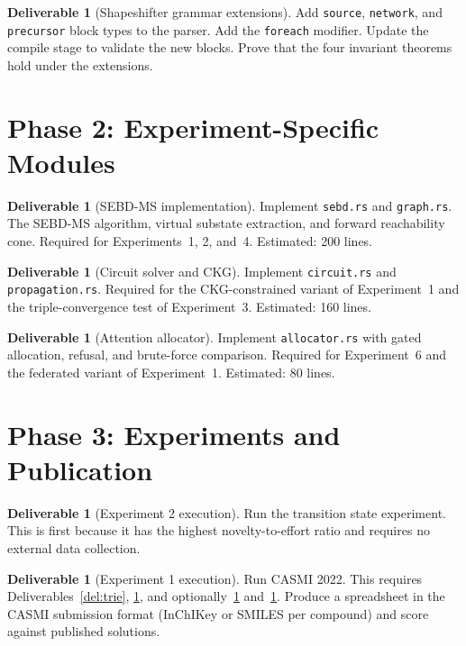 \documentclass[11pt,a4paper]{article}
\theoremstyle{planstyle}
\theoremstyle{definition}
\newtheorem{deliverable}[theorem]{Deliverable}
\theoremstyle{remark}
\newcommand{\shk}[1]{\texttt{#1}}
\begin{document}
\begin{deliverable}[Shapeshifter grammar extensions]
\label{del:grammar}
Add \shk{source}, \shk{network}, and \shk{precursor} block types to
the parser. Add the \shk{foreach} modifier. Update the compile stage
to validate the new blocks. Prove that the four invariant theorems
hold under the extensions.
\end{deliverable}

\section{Phase 2: Experiment-Specific Modules}
\label{sec:phase2}

\begin{deliverable}[SEBD-MS implementation]
\label{del:sebd}
Implement \shk{sebd.rs} and \shk{graph.rs}. The SEBD-MS algorithm,
virtual substate extraction, and forward reachability cone. Required
for Experiments~1, 2, and~4. Estimated: 200 lines.
\end{deliverable}

\begin{deliverable}[Circuit solver and CKG]
\label{del:circuit}
Implement \shk{circuit.rs} and \shk{propagation.rs}. Required for the
CKG-constrained variant of Experiment~1 and the triple-convergence test
of Experiment~3. Estimated: 160 lines.
\end{deliverable}

\begin{deliverable}[Attention allocator]
\label{del:allocator}
Implement \shk{allocator.rs} with gated allocation, refusal, and
brute-force comparison. Required for Experiment~6 and the federated
variant of Experiment~1. Estimated: 80 lines.
\end{deliverable}

\section{Phase 3: Experiments and Publication}
\label{sec:phase3}

\begin{deliverable}[Experiment 2 execution]
\label{del:exp2}
Run the transition state experiment. This is first because it has the
highest novelty-to-effort ratio and requires no external data
collection.
\end{deliverable}

\begin{deliverable}[Experiment 1 execution]
\label{del:exp1}
Run CASMI 2022. This requires Deliverables~\ref{del:trie},
\ref{del:sebd}, and optionally~\ref{del:circuit} and~\ref{del:allocator}.
Produce a spreadsheet in the CASMI submission format (InChIKey or
SMILES per compound) and score against published solutions.
\end{deliverable}
\end{document}
